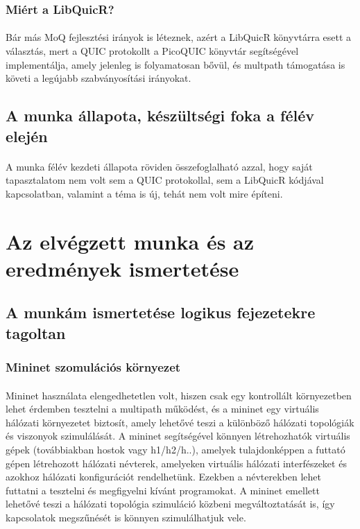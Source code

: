 \documentclass[a4paper,oneside]{article}
\begin{document}
\subsubsection{Miért a LibQuicR?}
\paragraph{}
Bár más MoQ fejlesztési irányok is léteznek, azért a LibQuicR könyvtárra esett a
választás, mert a QUIC protokollt a PicoQUIC könyvtár segítségével implementálja, amely
jelenleg is folyamatosan bővül, és multpath támogatása is követi a legújabb szabványosítási irányokat.

\subsection{A munka állapota, készültségi foka a félév elején}
\label{sec:munka-allap-kesz}
\paragraph{}
A munka félév kezdeti állapota röviden összefoglalható azzal, 
hogy saját tapasztalatom nem volt sem a QUIC protokollal, sem a LibQuicR
kódjával kapcsolatban, valamint a téma is új, tehát nem volt mire építeni.

\newpage
\section{Az elvégzett munka és az eredmények ismertetése}
\label{sec:az-elvegzett-munka}


\subsection{A munkám ismertetése logikus fejezetekre tagoltan}
\label{sec:a-munkam-ismert}

\subsubsection{Mininet szomulációs környezet}

 \paragraph{}

Mininet használata elengedhetetlen volt, hiszen csak egy kontrollált környezetben 
lehet érdemben tesztelni a multipath működést, és a mininet 
egy virtuális hálózati környezetet biztosít, amely lehetővé teszi a különböző 
hálózati topológiák és viszonyok szimulálását. 
A mininet segítségével könnyen 
létrehozhatók virtuális gépek (továbbiakban hostok vagy h1/h2/h..), 
amelyek tulajdonképpen a futtató gépen létrehozott hálózati névterek, amelyeken virtuális
hálózati interfészeket és azokhoz hálózati konfigurációt rendelhetünk.
Ezekben a névterekben lehet futtatni a tesztelni és megfigyelni kívánt programokat.
A mininet emellett lehetővé teszi a hálózati topológia 
szimuláció közbeni megváltoztatását is, így kapcsolatok megszűnését 
is könnyen szimulálhatjuk vele.
\end{document}
